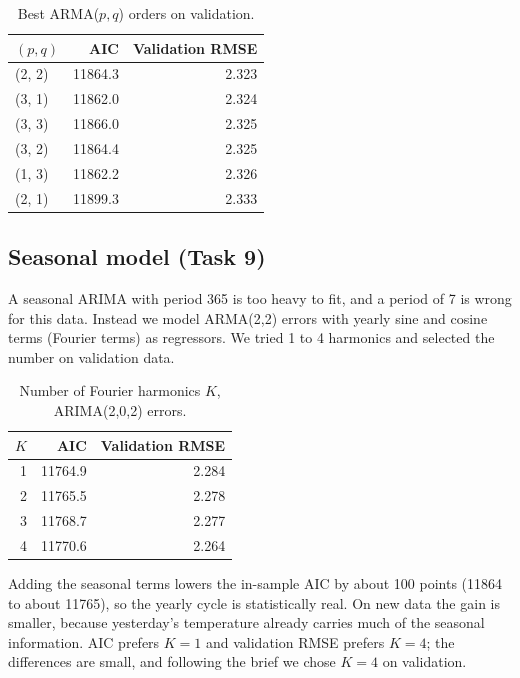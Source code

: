 \documentclass[11pt,a4paper]{article}
\begin{document}
\begin{table}[H]\centering
\caption{Best ARMA($p,q$) orders on validation.}
\begin{tabular}{lrr}
\toprule
$(p,q)$ & AIC & Validation RMSE\\
\midrule
(2, 2) & 11864.3 & 2.323\\
(3, 1) & 11862.0 & 2.324\\
(3, 3) & 11866.0 & 2.325\\
(3, 2) & 11864.4 & 2.325\\
(1, 3) & 11862.2 & 2.326\\
(2, 1) & 11899.3 & 2.333\\
\bottomrule
\end{tabular}
\end{table}

\subsection{Seasonal model (Task 9)}
A seasonal ARIMA with period 365 is too heavy to fit, and a period of 7 is wrong for this data. Instead we model ARMA(2,2) errors with yearly sine and cosine terms (Fourier terms) as regressors. We tried 1 to 4 harmonics and selected the number on validation data.

\begin{table}[H]\centering
\caption{Number of Fourier harmonics $K$, ARIMA(2,0,2) errors.}
\begin{tabular}{rrr}
\toprule
$K$ & AIC & Validation RMSE\\
\midrule
1 & 11764.9 & 2.284\\
2 & 11765.5 & 2.278\\
3 & 11768.7 & 2.277\\
4 & 11770.6 & 2.264\\
\bottomrule
\end{tabular}
\end{table}

Adding the seasonal terms lowers the in-sample AIC by about 100 points (11864 to about 11765), so the yearly cycle is statistically real. On new data the gain is smaller, because yesterday's temperature already carries much of the seasonal information. AIC prefers $K=1$ and validation RMSE prefers $K=4$; the differences are small, and following the brief we chose $K=4$ on validation.

\end{document}
